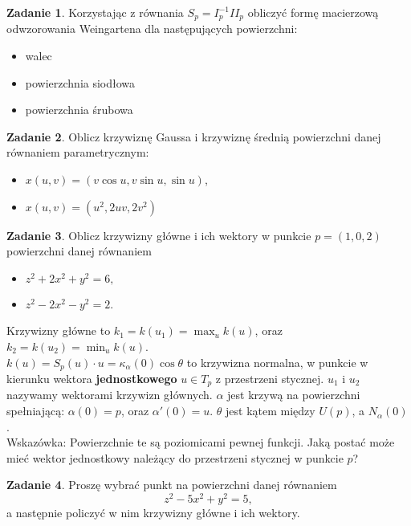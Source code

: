\documentclass[a4paper,11pt]{article}
\theoremstyle{definition}\newtheorem{exercise}{Zadanie}
\theoremstyle{definition}\newtheorem{remark}{Uwaga}
\begin{document}
\begin{exercise}
Korzystając z r\'ownania $S_p = I_p^{-1} II_p$ obliczyć formę macierzową 
odwzorowania Weingartena dla następujących powierzchni:
\begin{itemize}
 \item walec
 \item powierzchnia siodłowa
 \item powierzchnia śrubowa
\end{itemize}

\end{exercise}

\begin{exercise}
Oblicz krzywiznę Gaussa i krzywiznę średnią powierzchni danej równaniem 
parametrycznym:
\begin{itemize}
 \item $x(u,v)=(v\cos u,v\sin u,\sin u)$,
 \item $x(u,v)=(u^2,2uv,2v^2)$
\end{itemize}
\end{exercise}

\begin{exercise}
Oblicz krzywizny główne i ich wektory w punkcie $p=(1,0,2)$ powierzchni danej 
równaniem
\begin{itemize}
 \item $z^2+2x^2+y^2=6,$
\item $z^2-2x^2-y^2=2$.
\end{itemize}
\small{Krzywizny główne to $k_1=k(u_1)=\max_{u}k(u)$, oraz 
$k_2=k(u_2)=\min_{u}k(u)$.\\$k(u)=S_p(u)\cdot u=\kappa_\alpha(0)\cos{\theta}$ 
to krzywizna normalna, w punkcie w kierunku wektora \textbf{jednostkowego} 
$u\in T_p$ z przestrzeni stycznej. $u_1$ i $u_2$ nazywamy wektorami krzywizn 
głównych. $\alpha$ jest krzywą na powierzchni spełniającą: $\alpha(0)=p$, oraz 
$\alpha'(0)=u$. $\theta$ jest kątem między $U(p)$, a $N_\alpha(0)$.\\[0.1in] 
Wskazówka: Powierzchnie te są poziomicami pewnej funkcji. Jaką postać może mieć 
wektor jednostkowy należący do przestrzeni stycznej w punkcie $p$?} 
\end{exercise}

\begin{exercise}
Proszę wybrać punkt na powierzchni danej równaniem\[z^2-5x^2+y^2=5,\]a 
następnie policzyć w nim krzywizny główne i ich wektory.
\end{exercise}
\end{document}
